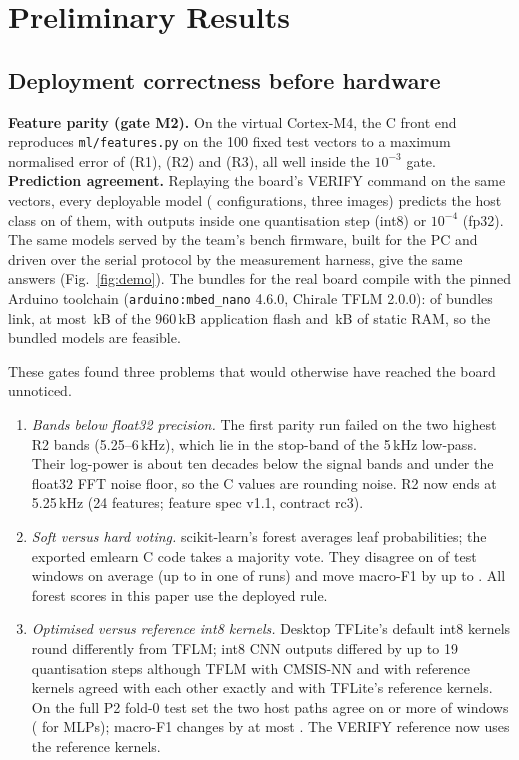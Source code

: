 \section{Preliminary Results}

\subsection{Deployment correctness before hardware}
\label{sec:gates}
\textbf{Feature parity (gate M2).} On the virtual Cortex-M4, the C front end reproduces \texttt{ml/features.py} on the
100 fixed test vectors to a maximum normalised error of \NumParityROne{} (R1), \NumParityRTwo{} (R2) and
\NumParityRThree{} (R3), all well inside the $10^{-3}$ gate. \textbf{Prediction agreement.} Replaying the board's
VERIFY command on the same vectors, every deployable model (\NumNModelsCost{} configurations, three images) predicts
the host class on \NumVerifyMin{} of them, with outputs inside one quantisation step (int8) or $10^{-4}$ (fp32). The
same models served by the team's bench firmware, built for the PC and driven over the serial protocol by the
measurement harness, give the same answers (Fig.~\ref{fig:demo}). The bundles for the real board compile with the
pinned Arduino toolchain (\texttt{arduino:mbed\_nano} 4.6.0, Chirale TFLM 2.0.0): \NumFwBundlesLink{} of
\NumFwBundles{} bundles link, at most \NumFwFlashMaxKB{}\,kB of the 960\,kB application flash and \NumFwRamMaxKB{}\,kB
of static RAM, so the \NumFwModels{} bundled models are feasible.

These gates found three problems that would otherwise have reached the board unnoticed.
\begin{enumerate}
\item \emph{Bands below float32 precision.} The first parity run failed on the two highest R2 bands (5.25--6\,kHz),
which lie in the stop-band of the 5\,kHz low-pass. Their log-power is about ten decades below the signal bands and
under the float32 FFT noise floor, so the C values are rounding noise. R2 now ends at 5.25\,kHz (24 features; feature
spec v1.1, contract rc3).
\item \emph{Soft versus hard voting.} scikit-learn's forest averages leaf probabilities; the exported emlearn C code
takes a majority vote. They disagree on \NumRfVoteDisMean{} of test windows on average (up to \NumRfVoteDisMax{} in
one of \NumRfVoteRuns{} runs) and move macro-F1 by up to \NumRfVoteFOneMax{}. All forest scores in this paper use the
deployed rule.
\item \emph{Optimised versus reference int8 kernels.} Desktop TFLite's default int8 kernels round differently from
TFLM; int8 CNN outputs differed by up to 19 quantisation steps although TFLM with CMSIS-NN and with reference kernels
agreed with each other exactly and with TFLite's reference kernels. On the full P2 fold-0 test set the two host paths
agree on \NumRefAgreeMin{} or more of windows (\NumRefMlpAgree{} for MLPs); macro-F1 changes by at most
\NumRefFOneMax{}. The VERIFY reference now uses the reference kernels.
\end{enumerate}


